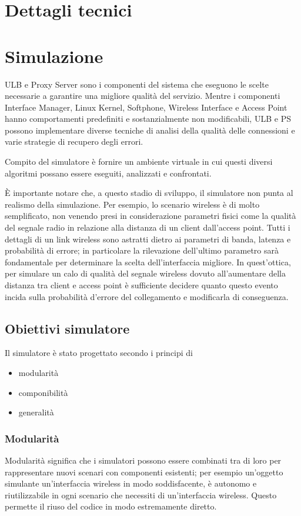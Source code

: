 \documentclass[12pt,a4paper,openright,twoside]{book}
\begin{document}
\chapter{Dettagli tecnici}


\chapter{Simulazione}
ULB e Proxy Server sono i componenti del sistema che eseguono le
scelte necessarie a garantire una migliore qualità del
servizio. Mentre i componenti Interface Manager, Linux Kernel,
Softphone, Wireless Interface e Access Point hanno comportamenti
predefiniti e sostanzialmente non modificabili, ULB e PS possono
implementare  diverse tecniche di analisi della qualità delle
connessioni e varie strategie di recupero degli errori.

Compito del simulatore è fornire un ambiente virtuale in cui questi
diversi algoritmi possano essere eseguiti, analizzati e confrontati.

È importante notare che, a questo stadio di sviluppo, il simulatore
non punta al realismo della simulazione. Per esempio, lo scenario
wireless è di molto semplificato, non venendo presi in considerazione
parametri fisici come la qualità del segnale radio in relazione alla
distanza di un client dall'access point. Tutti i dettagli di un link
wireless sono astratti dietro ai parametri di banda, latenza e
probabilità di errore; in particolare la rilevazione dell'ultimo
parametro sarà fondamentale per determinare la scelta dell'interfaccia
migliore. In quest'ottica, per simulare un calo di qualità del segnale
wireless dovuto all'aumentare della distanza tra client e access point
è sufficiente decidere quanto questo evento incida sulla probabilità
d'errore del collegamento e modificarla di conseguenza.

\section{Obiettivi simulatore}
Il simulatore è stato progettato secondo i principi di
\begin{itemize}
\item modularità
\item componibilità
\item generalità
\end{itemize}

\subsection{Modularità}
Modularità significa che i simulatori possono essere combinati tra di
loro per rappresentare nuovi scenari con componenti esistenti; per
esempio un'oggetto simulante un'interfaccia wireless in modo
soddisfacente, è autonomo e riutilizzabile in ogni scenario che
necessiti di un'interfaccia wireless. Questo permette il riuso del
codice in modo estremamente diretto.
\end{document}

